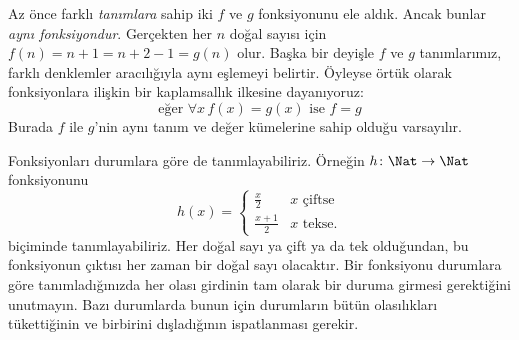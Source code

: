 \begin{explain}
Az önce farklı \emph{tanımlara} sahip iki $f$ ve $g$ fonksiyonunu ele aldık.
Ancak bunlar \emph{aynı fonksiyondur}. Gerçekten her $n$ doğal sayısı için
$f(n)=n+1=n+2-1=g(n)$ olur. Başka bir deyişle $f$ ve $g$ tanımlarımız,
farklı denklemler aracılığıyla aynı eşlemeyi belirtir. Öyleyse örtük olarak
fonksiyonlara ilişkin bir kaplamsallık ilkesine dayanıyoruz:
\[
  \text{eğer }\forall x\, f(x) = g(x)\text{ ise }f = g
\]
Burada $f$ ile $g$'nin aynı tanım ve değer kümelerine sahip olduğu
varsayılır.
\end{explain}

\begin{ex}
Fonksiyonları durumlara göre de tanımlayabiliriz. Örneğin
$h \colon \Nat \to \Nat$ fonksiyonunu
\[
h(x) =
\begin{cases}
  \frac{x}{2} & \text{$x$ çiftse} \\
  \frac{x+1}{2} & \text{$x$ tekse.}
\end{cases}
\]
biçiminde tanımlayabiliriz. Her doğal sayı ya çift ya da tek olduğundan, bu
fonksiyonun çıktısı her zaman bir doğal sayı olacaktır. Bir fonksiyonu
durumlara göre tanımladığınızda her olası girdinin tam olarak bir duruma
girmesi gerektiğini unutmayın. Bazı durumlarda bunun için durumların bütün
olasılıkları tükettiğinin ve birbirini dışladığının ispatlanması gerekir.
\end{ex}

